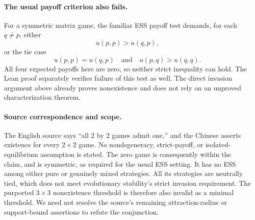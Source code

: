 \documentclass[11pt]{article}
\begin{document}
\paragraph{The usual payoff criterion also fails.}
For a symmetric matrix game, the familiar ESS payoff test demands, for each $q\ne p$, either
\[
 u(p,p)>u(q,p),
\]
or the tie case
\[
 u(p,p)=u(q,p)\quad\text{and}\quad u(p,q)>u(q,q).
\]
All four expected payoffs here are zero, so neither strict inequality can hold. The Lean proof separately verifies failure of this test as well. The direct invasion argument above already proves nonexistence and does not rely on an unproved characterization theorem.

\paragraph{Source correspondence and scope.}
The English source says ``all $2$ by $2$ games admit one,'' and the Chinese asserts existence for every $2\times2$ game. No nondegeneracy, strict-payoff, or isolated-equilibrium assumption is stated. The zero game is consequently within the claim, and is symmetric, as required for the usual ESS setting. It has no ESS among either pure or genuinely mixed strategies. All its strategies are neutrally tied, which does not meet evolutionary stability's strict invasion requirement. The purported $3\times3$ nonexistence threshold is therefore also invalid as a minimal threshold. We need not resolve the source's remaining attraction-radius or support-bound assertions to refute the conjunction.
\end{document}
